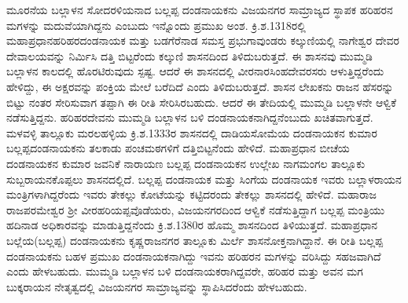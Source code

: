 ಮೂರನೆಯ ಬಲ್ಲಾಳನ ಸೋದರಳಿಯನಾದ ಬಲ್ಲಪ್ಪ ದಂಡನಾಯಕನು ವಿಜಯನಗರ ಸಾಮ್ರಾಜ್ಯದ ಸ್ಥಾಪಕ ಹರಿಹರನ ಮಗಳನ್ನು ಮದುವೆಯಾಗಿದ್ದನು ಎಂಬುದು ಇನ್ನೊಂದು ಪ್ರಮುಖ ಅಂಶ. ಕ್ರಿ.ಶ.1318ರಲ್ಲಿ ಮಹಾಪ್ರಧಾನ\break ಹರಿಹರದಂಡನಾಯಕ ಮತ್ತು ಬಡಗೆರೆನಾಡ ಸಮಸ್ತ ಪ್ರಭುಗಾವುಂಡರು ಕಲ್ಕುಣಿಯಲ್ಲಿ ನಾಗೇಶ್ವರ ದೇವರ ದೇವಾಲಯವನ್ನು ನಿರ್ಮಿಸಿ ದತ್ತಿ ಬಿಟ್ಟರೆಂದು ಕಲ್ಕುಣಿ ಶಾಸನದಿಂದ ತಿಳಿದುಬರುತ್ತದೆ. ಈ ಶಾಸನವು ಮುಮ್ಮಡಿ ಬಲ್ಲಾಳನ ಕಾಲದಲ್ಲಿ ಹೊರಟಿರುವುದು ಸ್ಪಷ್ಟ. ಆದರೆ ಈ ಶಾಸನದಲ್ಲಿ ವೀರನಾರಸಿಂಹದೇವರಸರು ಆಳುತ್ತಿದ್ದರೆಂದು ಹೇಳಿದ್ದು, ಈ ಅಕ್ಷರವನ್ನು ಪಂಕ್ತಿಯ ಮೇಲೆ ಬರೆದಿದೆ ಎಂದು ತಿಳಿದುಬರುತ್ತದೆ. ಶಾಸನ ಲೇಖಕನು ರಾಜನ ಹೆಸರನ್ನು ಬಿಟ್ಟು ನಂತರ ಸೇರಿಸುವಾಗ ತಪ್ಪಾಗಿ ಈ ರೀತಿ ಸೇರಿಸಿರಬಹುದು. ಆದರೆ ಈ ತೇದಿಯಲ್ಲಿ ಮುಮ್ಮಡಿ ಬಲ್ಲಾಳನೇ ಆಳ್ವಿಕೆ ನಡೆಸುತ್ತಿದ್ದನು. ಹರಿಹರದೇವನು ಮುಮ್ಮಡಿ ಬಲ್ಲಾಳನ ಬಳಿ ದಂಡನಾಯಕನಾಗಿದ್ದನೆಂಬುದು ಖಚಿತವಾಗುತ್ತದೆ. ಮಳವಳ್ಳಿ ತಾಲ್ಲೂಕು ಮರಲಹಳ್ಳಿಯ ಕ್ರಿ.ಶ.1333ರ ಶಾಸನದಲ್ಲಿ ದಾಡಿಯಸೋಮೆಯ ದಂಡನಾಯಕನ ಕುಮಾರ ಬಲ್ಲಪ್ಪದಂಡನಾಯಕನು ತಲಕಾಡು ಪಂಚಮಠಗಳಿಗೆ ದತ್ತಿಬಿಟ್ಟ\-ನೆಂದು ಹೇಳಿದೆ. ಮಹಾಪ್ರಧಾನ ಬೀಚೆಯ ದಂಡನಾಯಕನ ಕುಮಾರ ಜವನಿಕೆ ನಾರಾಯಣ ಬಲ್ಲಪ್ಪ ದಂಡನಾಯಕನ ಉಲ್ಲೇಖ ನಾಗಮಂಗಲ ತಾಲ್ಲೂಕು ಸುಬ್ಬರಾಯನಕೊಪ್ಪಲು ಶಾಸನದಲ್ಲಿದೆ. ಬಲ್ಲಪ್ಪ ದಂಡನಾಯಕ ಮತ್ತು ಸಿಂಗೆಯ ದಂಡನಾಯಕ ಇವರು ಬಲ್ಲಾಳರಾಯನ ಮಂತ್ರಿಗಳಾಗಿದ್ದರೆಂದು ಇವರು ತೇಕಲ್ಲು ಕೋಟೆಯನ್ನು ಕಟ್ಟಿದರಂದು ತೇಕಲ್ಲು ಶಾಸನದಲ್ಲಿ ಹೇಳಿದೆ. ಮಹಾರಾಜ ರಾಜಪರಮೇಶ್ವರ ಶ‍್ರೀ ವೀರಹರಿಯಪ್ಪವೊಡೆಯರು, ವಿಜಯನಗರದಿಂದ ಆಳ್ವಿಕೆ ನಡೆಸುತ್ತಿದ್ದಾಗ ಬಲ್ಲಪ್ಪ ಮಂತ್ರಿಯು ಹದಿನಾಡ ಅಧಿಕಾರವನ್ನು ಮಾಡುತ್ತಿದ್ದನೆಂದು ಕ್ರಿ.ಶ.1380ರ ಹೊಮ್ಮ ಶಾಸನದಿಂದ ತಿಳಿಯುತ್ತದೆ. ಮಹಾಪ್ರಧಾನ ಬಲ್ಲೆಯ(ಬಲ್ಲಪ್ಪ) ದಂಡನಾಯಕನು ಕೃಷ್ಣರಾಜನಗರ ತಾಲ್ಲೂಕು ಮಿರ್ಲೆ ಶಾಸನೋಕ್ತನಾಗಿ\-ದ್ದಾನೆ. ಈ ರೀತಿ ಬಲ್ಲಪ್ಪ ದಂಡನಾಯಕನು ಬಹಳ ಪ್ರಮುಖ ದಂಡನಾಯಕನಾಗಿದ್ದು ಇವನು ಹರಿಹರನ ಮಗಳನ್ನು ವರಿಸಿದ್ದು ಸಹಜವಾಗಿದೆ ಎಂದು ಹೇಳಬಹುದು. ಮುಮ್ಮಡಿ ಬಲ್ಲಾಳನ ಬಳಿ ದಂಡನಾಯಕರಾಗಿದ್ದವರೇ, ಹರಿಹರ ಮತ್ತು ಅವನ ಮಗ ಬುಕ್ಕರಾಯನ ನೇತೃತ್ವದಲ್ಲಿ ವಿಜಯನಗರ ಸಾಮ್ರಾಜ್ಯವನ್ನು ಸ್ಥಾಪಿಸಿದರೆಂದು ಹೇಳಬಹುದು.

